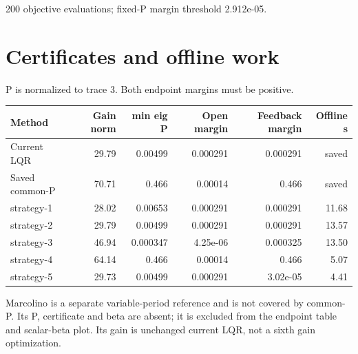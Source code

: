 \documentclass[11pt,a4paper]{article}
\begin{document}
200 objective evaluations; fixed-P margin threshold 2.912e-05.

\clearpage\section*{Certificates and offline work}
P is normalized to trace 3. Both endpoint margins must be positive.
\begin{center}\small\begin{tabular}{lrrrrr}
\toprule
Method & Gain norm & min eig P & Open margin & Feedback margin & Offline s \\
\midrule
Current LQR & 29.79 & 0.00499 & 0.000291 & 0.000291 & saved \\
Saved common-P & 70.71 & 0.466 & 0.00014 & 0.466 & saved \\
strategy-1 & 28.02 & 0.00653 & 0.000291 & 0.000291 & 11.68 \\
strategy-2 & 29.79 & 0.00499 & 0.000291 & 0.000291 & 13.57 \\
strategy-3 & 46.94 & 0.000347 & 4.25e-06 & 0.000325 & 13.50 \\
strategy-4 & 64.14 & 0.466 & 0.00014 & 0.466 & 5.07 \\
strategy-5 & 29.73 & 0.00499 & 0.000291 & 3.02e-05 & 4.41 \\
\bottomrule
\end{tabular}\end{center}
Marcolino is a separate variable-period reference and is not covered by common-P. Its P, certificate and beta are absent; it is excluded from the endpoint table and scalar-beta plot. Its gain is unchanged current LQR, not a sixth gain optimization.
\end{document}
